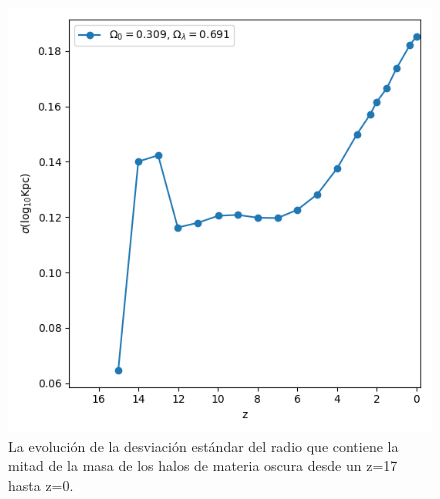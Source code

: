 \documentclass{beamer}
\begin{document}
\begin{frame}
\begin{columns}[t]
			\begin{column}{.5\textwidth}
				\begin{figure}
					\centering
					\includegraphics[scale=0.3]{RunCanonica/HalfMassRad_Std_RunCanonica.png}
					\caption{\footnotesize La evolución de la desviación estándar del radio que contiene la mitad de la masa de los halos de materia oscura desde un z=17 hasta z=0.}
					\label{fig:Canon-HalfMassRadStd}
				\end{figure}
			\end{column}
		\end{columns}

	\end{frame}	
\end{document}

